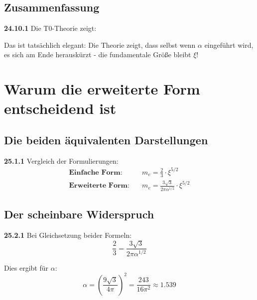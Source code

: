 \documentclass[12pt,a4paper]{article}
\begin{document}
\subsection{Zusammenfassung}

\noindent \textbf{24.10.1} Die T0-Theorie zeigt:
\begin{center}
\end{center}

Das ist tatsächlich elegant: Die Theorie zeigt, dass selbst wenn $\alpha$ eingeführt wird, es sich am Ende herauskürzt - die fundamentale Größe bleibt $\xi$!


\section{Warum die erweiterte Form entscheidend ist}

\subsection{Die beiden äquivalenten Darstellungen}

\noindent \textbf{25.1.1} Vergleich der Formulierungen:
\begin{align*}
	\textbf{Einfache Form:} &\quad m_e = \frac{2}{3} \cdot \xi^{5/2} \\
	\textbf{Erweiterte Form:} &\quad m_e = \frac{3\sqrt{3}}{2\pi\alpha^{1/2}} \cdot \xi^{5/2}
\end{align*}

\subsection{Der scheinbare Widerspruch}

\noindent \textbf{25.2.1} Bei Gleichsetzung beider Formeln:
\[
\frac{2}{3} = \frac{3\sqrt{3}}{2\pi\alpha^{1/2}}
\]

Dies ergibt für $\alpha$:
\[
\alpha = \left(\frac{9\sqrt{3}}{4\pi}\right)^2 = \frac{243}{16\pi^2} \approx 1.539
\]
\end{document}
